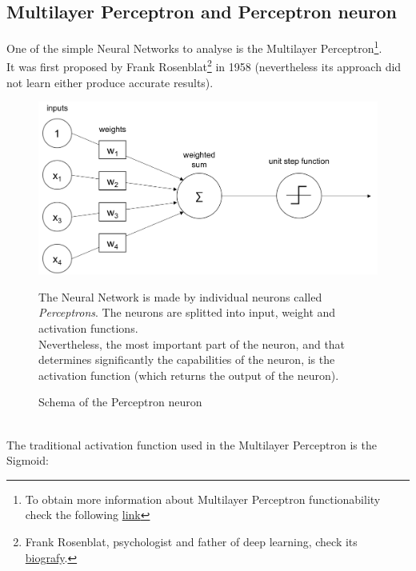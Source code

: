 \documentclass[a4paper, 11pt]{article}
\begin{document}
\subsection{Multilayer Perceptron and Perceptron neuron}
One of the simple Neural Networks to analyse is the Multilayer Perceptron\footnote{To obtain more information about Multilayer Perceptron functionability check the following \href{https://en.wikipedia.org/wiki/Multilayer_perceptron}{link}}.\\
It was first proposed by Frank Rosenblat\footnote{Frank Rosenblat, psychologist and father of deep learning, check its \href{https://en.wikipedia.org/wiki/Frank_Rosenblat}{biografy}.} in 1958 (nevertheless its approach did not learn either produce accurate results).
\begin{figure}[h]
    \begin{minipage}{9cm}
       \begin{center}
           \includegraphics[width = 1 \textwidth]{Neural_Network/perceptron_schema.png}
           \caption{Schema of the Perceptron neuron}
       \end{center} 
    \end{minipage}
    \hspace{1em}
    \begin{minipage}{5cm}
        The Neural Network is made by individual neurons called \textit{Perceptrons}. The neurons are splitted into input, weight and activation functions.\\
        Nevertheless, the most important part of the neuron, and that determines significantly the capabilities of the neuron, is the activation function (which returns the output of the neuron).
    \end{minipage}
\end{figure}\\
The traditional activation function used in the Multilayer Perceptron is the Sigmoid: 
\end{document}
